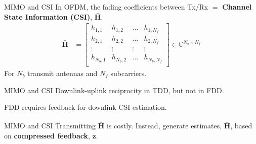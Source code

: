 \documentclass{beamer}
\newcommand{\fignocap}[2]{
	\begin{figure}[!hbtp]
	    \centering
		\texttt{[image: \#2]}
	\end{figure}
}
\begin{document}
	\begin{frame}{MIMO and CSI}
		In OFDM, the fading coefficients between Tx/Rx $=$ \textbf{Channel State Information (CSI)}, $\bar{\mathbf{H}}$. 
		\begin{align*}
			\bar{\mathbf{H}}&=\begin{bmatrix}
            							h_{1,1} & h_{1,2} & \dots  & h_{1,N_f} \\
            							h_{2,1} & h_{2,2} & \dots  & h_{2,N_f} \\
            							\vdots	& \vdots  & \vdots & \vdots    \\
            							h_{N_{b},1} & h_{N_{b},2} & \dots  & h_{N_{b},N_f} \\
            						\end{bmatrix}
                        \in \mathbb C^{N_b \times N_f}
		\end{align*}
    For $N_b$ transmit antennas and $N_f$ subcarriers.
	\end{frame}

  \begin{frame}{MIMO and CSI}
    Downlink-uplink reciprocity in TDD, but not in FDD.
    \begin{figure}[!hbtp]
    \centering
    {
      \fontsize{4pt}{8pt}
      \def\svgwidth{0.9\columnwidth}
      
    }
    \end{figure}
    \pause
    FDD requires feedback for downlink CSI estimation.
  \end{frame}

  \begin{frame}{MIMO and CSI}
    Transmitting $\bar{\mathbf{H}}$ is costly. Instead, generate estimates, $\hat{\bar{\mathbf{H}}}$, based on \textbf{compressed feedback}, $\mathbf z$.\\
    \vspace{24pt}
    \begin{figure}[!hbtp]
    \centering
    {
      \fontsize{4pt}{6pt}
      \def\svgwidth{0.9\columnwidth}
      
    }
    \end{figure}
  \end{frame}
\end{document}
